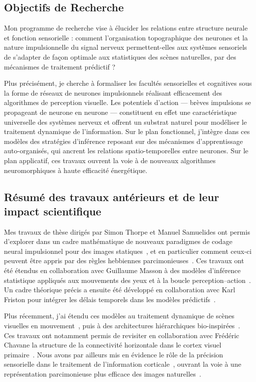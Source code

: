 \documentclass[10pt,french,a4paper,twoside]{article}%
\begin{document}
\newpage


\subsection*{Objectifs de Recherche}

Mon programme de recherche vise à élucider les relations entre structure
neurale et fonction sensorielle : comment l'organisation topographique des
neurones et la nature impulsionnelle du signal nerveux permettent-elles aux
systèmes sensoriels de s'adapter de façon optimale aux statistiques des
scènes naturelles, par des mécanismes de traitement prédictif ?

Plus précisément, je cherche à formaliser les facultés sensorielles et
cognitives sous la forme de réseaux de neurones impulsionnels réalisant
efficacement des algorithmes de perception visuelle. Les potentiels d'action
--- brèves impulsions se propageant de neurone en neurone --- constituent en
effet une caractéristique universelle des systèmes nerveux et offrent un
substrat naturel pour modéliser le traitement dynamique de l'information.
Sur le plan fonctionnel, j'intègre dans ces modèles des stratégies
d'inférence reposant sur des mécanismes d'apprentissage auto-organisés, qui
ancrent les relations spatio-temporelles entre neurones. Sur le plan
applicatif, ces travaux ouvrent la voie à de nouveaux algorithmes
neuromorphiques à haute efficacité énergétique.

\subsection*{Résumé des travaux antérieurs et de leur impact scientifique}

Mes travaux de thèse dirigés par Simon Thorpe et Manuel Samuelides ont permis d'explorer dans un cadre mathématique de nouveaux paradigmes de codage neural impulsionnel pour des images statiques~\citep{Perrinet03ieee}, et en particulier comment ceux-ci peuvent être appris par des règles hebbiennes parcimonieuses~\citep{Perrinet10shl}. Ces travaux ont été étendus en collaboration avec Guillaume Masson à des modèles d'inférence statistique appliqués aux mouvements des yeux et à la boucle perception--action~\citep{Simoncini12}. Un cadre théorique précis a ensuite été développé en collaboration avec Karl Friston pour intégrer les délais temporels dans les modèles prédictifs~\citep{PerrinetAdamsFriston14}.

Plus récemment, j'ai étendu ces modèles au traitement dynamique de scènes visuelles en mouvement~\citep{KhoeiMassonPerrinet17}, puis à des architectures hiérarchiques bio-inspirées~\citep{BoutinFranciosiniChavaneRuffierPerrinet20,Franciosini21}. Ces travaux ont notamment permis de revisiter  en collaboration avec Frédéric Chavane la structure de la connectivité horizontale dans le cortex visuel primaire~\citep{Chavane22}. Nous avons par ailleurs mis en évidence le rôle de la précision sensorielle dans le traitement de l'information corticale~\citep{Ladret23}, ouvrant la voie à une représentation parcimonieuse plus efficace des images naturelles~\citep{Ladret24sparse}.
\end{document}

